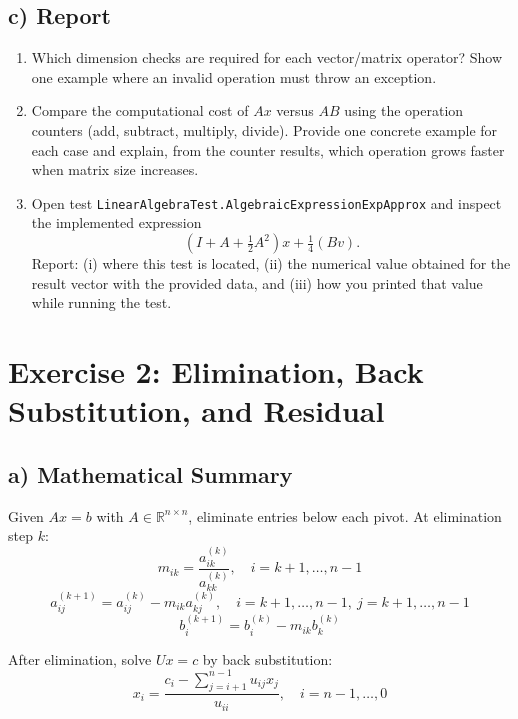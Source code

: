 \documentclass[11pt,a4paper]{article}
\begin{document}
\subsection*{c) Report}
\begin{enumerate}[leftmargin=*]
    \item Which dimension checks are required for each vector/matrix operator? Show one example where an invalid operation must throw an exception.
    \item Compare the computational cost of $Ax$ versus $AB$ using the
    operation counters (add, subtract, multiply, divide). Provide one concrete
    example for each case and explain, from the counter results, which operation
    grows faster when matrix size increases.
    \item Open test \texttt{LinearAlgebraTest.AlgebraicExpressionExpApprox}
    and inspect the implemented expression
    $$
    (I + A + \tfrac{1}{2}A^2)x + \tfrac{1}{4}(Bv).
    $$
    Report: (i) where this test is located, (ii) the numerical value obtained
    for the result vector with the provided data, and (iii) how you printed
    that value while running the test.
\end{enumerate}
\par

\section*{Exercise 2: Elimination, Back Substitution, and Residual}

\subsection*{a) Mathematical Summary}
Given $Ax=b$ with $A\in\mathbb{R}^{n\times n}$, eliminate entries below each pivot.
At elimination step $k$:
$$
m_{ik} = \frac{a^{(k)}_{ik}}{a^{(k)}_{kk}},\quad i=k+1,\dots,n-1
$$
$$
a^{(k+1)}_{ij} = a^{(k)}_{ij} - m_{ik}a^{(k)}_{kj},\quad
i=k+1,\dots,n-1,\ j=k+1,\dots,n-1
$$
$$
b^{(k+1)}_i = b^{(k)}_i - m_{ik}b^{(k)}_k
$$

After elimination, solve $Ux=c$ by back substitution:
$$
x_i = \frac{c_i - \sum_{j=i+1}^{n-1} u_{ij}x_j}{u_{ii}},\quad i=n-1,\dots,0
$$
\end{document}
